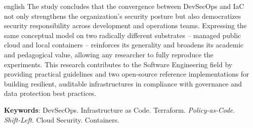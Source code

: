 \begin{resumo}[Abstract]
\begin{otherlanguage*}{english}
The study concludes that the convergence between DevSecOps and IaC not only strengthens the organization's security posture but also democratizes security responsibility across development and operations teams. Expressing the same conceptual model on two radically different substrates -- managed public cloud and local containers -- reinforces its generality and broadens its academic and pedagogical value, allowing any researcher to fully reproduce the experiments. This research contributes to the Software Engineering field by providing practical guidelines and two open-source reference implementations for building resilient, auditable infrastructures in compliance with governance and data protection best practices.

  \vspace{\onelineskip}
  \noindent 
  \textbf{Keywords}: DevSecOps. Infrastructure as Code. Terraform. \textit{Policy-as-Code}. \textit{Shift-Left}. Cloud Security. Containers.
 \end{otherlanguage*}
\end{resumo}